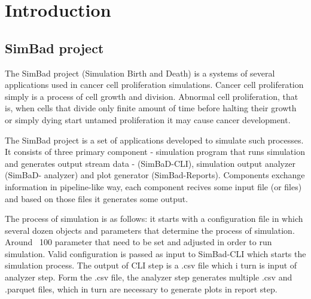 \chapter{Introduction}
\section{SimBad project}
The SimBad project (Simulation Birth and Death) is a systems of several applications used in cancer cell proliferation simulations. Cancer cell proliferation simply is a  process of cell growth and division. Abnormal cell proliferation, that is, when  cells that divide only finite amount of time before halting their growth or simply dying start untamed proliferation it may cause cancer development.

The SimBad project is a set of applications developed to simulate such processes. It consists of three primary component - simulation program that runs simulation and generates output stream data - (SimBaD-CLI), simulation output analyzer (SimBaD- analyzer) and plot generator (SimBad-Reports). Components exchange information in pipeline-like way, each component recives some input file (or files) and based on those files it generates some output.

The process of simulation is as follows: it starts with a configuration file in which several dozen objects and parameters that determine the process of simulation. Around ~100 parameter that need to be set and adjusted in order to run simulation. Valid configuration is passed as input to SimBad-CLI which starts the simulation process. The output of CLI step is a .csv file which i turn is input of analyzer step. Form the .csv file, the analyzer step generates multiple .csv and .parquet files, which in turn are necessary to generate plots
in report step.

